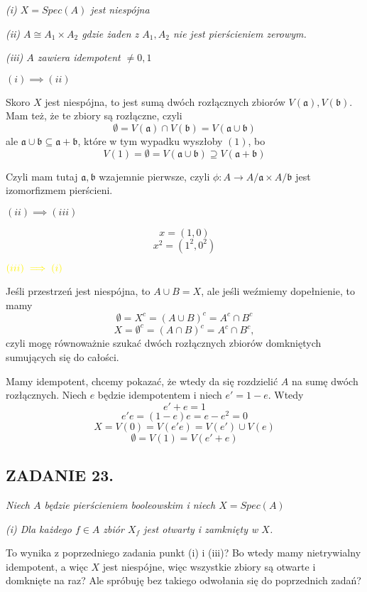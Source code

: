 \documentclass{article}
\begin{document}
\emph{(i) $X=Spec(A)$ jest niespójna}

\emph{(ii) $A\cong A_1\times A_2$ gdzie żaden z $A_1,A_2$ nie jest pierścieniem zerowym.}

\emph{(iii) $A$ zawiera idempotent $\neq0,1$}
\medskip

$(i)\implies (ii)$

Skoro $X$ jest niespójna, to jest sumą dwóch rozłącznych zbiorów $V(\mathfrak{a}), V(\mathfrak{b})$.  Mam też, że te zbiory są rozłączne, czyli
$$\emptyset=V(\mathfrak{a})\cap V(\mathfrak{b})=V(\mathfrak{a}\cup\mathfrak{b})$$
ale $\mathfrak{a}\cup\mathfrak{b}\subseteq\mathfrak{a}+\mathfrak{b}$, które w tym wypadku wyszłoby $(1)$, bo
$$V(1)=\emptyset=V(\mathfrak{a}\cup\mathfrak{b})\supseteq V(\mathfrak{a}+\mathfrak{b})$$

Czyli mam tutaj $\mathfrak{a},\mathfrak{b}$ wzajemnie pierwsze, czyli $\phi:A\to A/\mathfrak{a}\times A/\mathfrak{b}$ jest izomorfizmem pierścieni.

$(ii)\implies (iii)$

$$x=(1, 0)$$
$$x^2=(1^2, 0^2)$$

$\color{yellow}(iii)\implies(i)$

Jeśli przestrzeń jest niespójna, to $A\cup B=X$, ale jeśli weźmiemy dopełnienie, to mamy 
$$\emptyset=X^c=(A\cup B)^c=A^c\cap B^c$$
$$X=\emptyset^c=(A\cap B)^c=A^c\cap B^c,$$ czyli mogę równoważnie szukać dwóch rozłącznych zbiorów domkniętych sumujących się do całości.

Mamy idempotent, chcemy pokazać, że wtedy da się rozdzielić $A$ na sumę dwóch rozłącznych. Niech $e$ będzie idempotentem i niech $e'=1-e$. Wtedy
$$e'+e=1$$
$$e'e=(1-e)e=e-e^2=0$$
$$X=V(0)=V(e'e)=V(e')\cup V(e)$$
$$\emptyset=V(1)=V(e'+e)$$

\subsection*{ZADANIE 23.}
\emph{\color{pink}Niech $A$ będzie pierścieniem booleowskim i niech $X=Spec(A)$}

\emph{\color{orange}(i) Dla każdego $f\in A$ zbiór $X_f$ jest otwarty i zamknięty w $X$.}

To wynika z poprzedniego zadania punkt (i) i (iii)? Bo wtedy mamy nietrywialny idempotent, a więc $X$ jest niespójne, więc wszystkie zbiory są otwarte i domknięte na raz? Ale spróbuję bez takiego odwołania się do poprzednich zadań?
\end{document}
